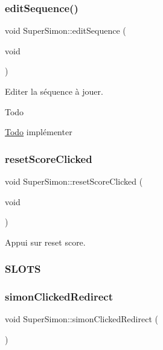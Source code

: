 \subsubsection{\texorpdfstring{edit\+Sequence()}{editSequence()}}
{\footnotesize\ttfamily void Super\+Simon\+::edit\+Sequence (\begin{DoxyParamCaption}\item[{void}]{ }\end{DoxyParamCaption})}



Editer la séquence à jouer. 

\begin{DoxyRefDesc}{Todo}
\item[\hyperlink{todo__todo000027}{Todo}]implémenter \end{DoxyRefDesc}
\mbox{\label{class_super_simon_a81bff9afba77880d36563aac5534ccd3}} 
\subsubsection{\texorpdfstring{reset\+Score\+Clicked}{resetScoreClicked}}
{\footnotesize\ttfamily void Super\+Simon\+::reset\+Score\+Clicked (\begin{DoxyParamCaption}\item[{void}]{ }\end{DoxyParamCaption})\hspace{0.3cm}{\ttfamily [slot]}}



Appui sur reset score. 



 \subsubsection*{S\+L\+O\+TS }\mbox{\label{class_super_simon_af495f2a329d2966c2f265cb46753a13d}} 
\subsubsection{\texorpdfstring{simon\+Clicked\+Redirect}{simonClickedRedirect}}
{\footnotesize\ttfamily void Super\+Simon\+::simon\+Clicked\+Redirect (\begin{DoxyParamCaption}{ }\end{DoxyParamCaption})\hspace{0.3cm}{\ttfamily [slot]}}



